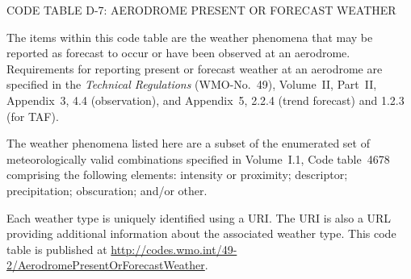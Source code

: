 CODE TABLE D-7: AERODROME PRESENT OR FORECAST WEATHER

The items within this code table are the weather phenomena that may be reported as forecast to occur or have been observed at an aerodrome. Requirements for reporting present or forecast weather at an aerodrome are specified in the \emph{Technical Regulations} (WMO-No.~49), Volume~II, Part~II, Appendix~3, 4.4 (observation), and Appendix~5, 2.2.4 (trend forecast) and 1.2.3 (for TAF).

The weather phenomena listed here are a subset of the enumerated set of meteorologically valid combinations specified in Volume~I.1, Code table~4678 comprising the following elements: intensity or proximity; descriptor; precipitation; obscuration; and/or other.

Each weather type is uniquely identified using a URI. The URI is also a URL providing additional information about the associated weather type. This code table is published at \url{http://codes.wmo.int/49-2/AerodromePresentOrForecastWeather}.

